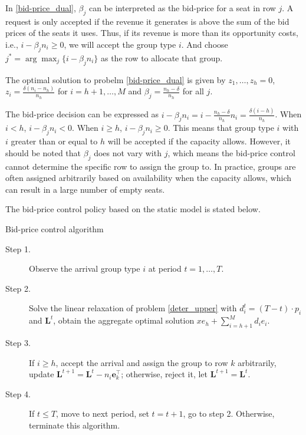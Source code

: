 In \eqref{bid-price_dual}, $\beta_{j}$ can be interpreted as the bid-price for a seat in row $j$. A request is only accepted if the revenue it generates is above the sum of the bid prices of the seats it uses. Thus, if its revenue is more than its opportunity costs, i.e., $i -\beta_{j} n_i \geq 0$, we will accept the group type $i$. And choose $j^{*} = \arg \max_{j} \{i -\beta_{j} n_i\}$ as the row to allocate that group.


\begin{lem}\label{bid-price}
 The optimal solution to probelm \eqref{bid-price_dual} is given by $z_1 ,\ldots, z_h =0$, $z_{i} = \frac{\delta(n_i-n_h)}{n_h}$ for $i = h+1, \ldots, M$ and $\beta_j = \frac{n_h - \delta}{n_h}$ for all $j$. 
\end{lem}

The bid-price decision can be expressed as $i - \beta_j n_i = i - \frac{n_h - \delta}{n_h} n_i = \frac{\delta (i - h)}{n_h}$. When $i < h$, $i - \beta_j n_i < 0$. When $i \geq h$, $i - \beta_j n_i \geq 0$. This means that group type $i$ with $i$ greater than or equal to $h$ will be accepted if the capacity allows. However, it should be noted that $\beta_j$ does not vary with $j$, which means the bid-price control cannot determine the specific row to assign the group to. In practice, groups are often assigned arbitrarily based on availability when the capacity allows, which can result in a large number of empty seats.

The bid-price control policy based on the static model is stated below.
\begin{algorithm}[H]
  \caption{Bid-price control algorithm}
  \begin{description}
    \item[Step 1.] Observe the arrival group type $i$ at period $t = 1, \ldots, T$.
    \item[Step 2.] Solve the linear relaxation of problem \eqref{deter_upper} with $d_i^{t} = (T-t) \cdot p_i$ and $\mathbf{L}^{t}$, obtain the aggregate optimal solution $x e_{h} + \sum_{i=h+1} ^{M} d_{i} e_{i}$.
    \item[Step 3.] If $i \geq h$, accept the arrival and assign the group to row $k$ arbitrarily, update $\mathbf{L}^{t+1} = \mathbf{L}^{t} - n_i \mathbf{e}_{k}^{\top}$; otherwise, reject it, let $\mathbf{L}^{t+1} = \mathbf{L}^{t}$.
    \item[Step 4.] If $t \leq T$, move to next period, set $t = t+1$, go to step 2. Otherwise, terminate this algorithm.
  \end{description}
\end{algorithm}


